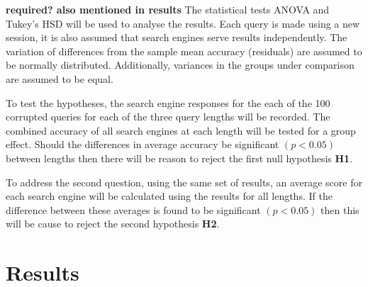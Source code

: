 \documentclass{csfourzero}
\begin{document}
\textbf{required? also mentioned in results} The statistical tests ANOVA and Tukey's HSD will be used to analyse the results. Each query is made using a new session, it is also assumed that search engines serve results independently. The variation of differences from the sample mean accuracy (residuals) are assumed to be normally distributed. Additionally, variances in the groups under comparison are assumed to be equal.

To test the hypotheses, the search engine responses for the each of the 100 corrupted queries for each of the three query lengths will be recorded. The combined accuracy of all search engines at each length will be tested for a group effect. Should the differences in average accuracy be significant $(p < 0.05)$ between lengths then there will be reason to reject the first null hypothesis \textbf{H1}.

To address the second question, using the same set of results, an average score for each search engine will be calculated using the results for all lengths. If the difference between these averages is found to be significant $(p < 0.05)$ then this will be cause to reject the second hypothesis \textbf{H2}.

\section{Results}
\label{sec:results}
\end{document}
